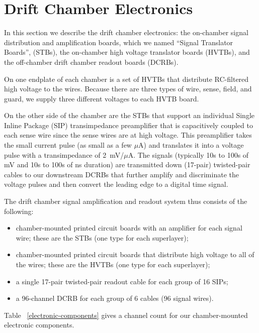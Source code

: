 \section{Drift Chamber Electronics}

In this section we describe the drift chamber electronics:
the on-chamber signal distribution and amplification boards, which
we named ``Signal Translator Boards'', (STBs),
the on-chamber high voltage translator boards (HVTBs), and the
off-chamber drift chamber readout boards (DCRBs).

On one endplate of each chamber is a set of HVTBs that distribute RC-filtered high voltage
to the wires.  Because there are three types of wire, sense, field, and guard, we supply
three different voltages to each HVTB board.  

On the other side of the chamber are the STBs that support an individual Single Inline Package
(SIP) transimpedance preamplifier that is capacitively coupled to each sense wire since the
sense wires are at high voltage.  This preamplifier takes the
small current pulse (as small as a few $\mu$A) and translates it into a voltage 
pulse with a transimpedance of 2~mV/$\mu$A.  The signals (typically
10s to 100s of mV and 10s to 100s of ns duration) are
transmitted down (17-pair) twisted-pair cables to our downstream DCRBs that further amplify and
discriminate the voltage pulses and then convert the leading edge
to a digital time signal.

The drift chamber signal amplification and readout system thus consists of the following:
\begin{itemize}
\item  chamber-mounted printed circuit boards with an amplifier for each signal wire; 
these are the STBs (one type for each superlayer);
\item  chamber-mounted printed circuit boards that distribute high voltage
to all of the wires; these are the HVTBs (one type for each superlayer);
\item a single 17-pair twisted-pair readout cable for each group of 16
SIPs;
\item a 96-channel DCRB for each group of 6 cables (96 signal wires).
\end{itemize}

Table ~\ref{electronic-components} gives a channel count for our chamber-mounted electronic components.

